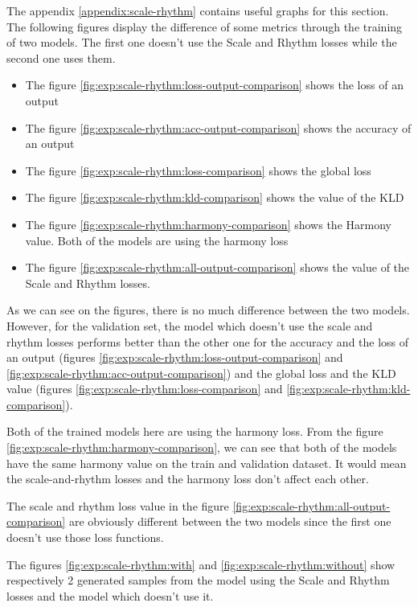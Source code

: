 \documentclass[12pt]{report}
\begin{document}
The appendix \ref{appendix:scale-rhythm} contains useful graphs for this section.
The following figures display the difference of some metrics through the training of two models. The first one doesn't use the Scale and Rhythm losses while the second one uses them.
\begin{itemize}
    \item The figure \ref{fig:exp:scale-rhythm:loss-output-comparison} shows the loss of an output
    \item The figure \ref{fig:exp:scale-rhythm:acc-output-comparison} shows the accuracy of an output
    \item The figure  \ref{fig:exp:scale-rhythm:loss-comparison} shows the global loss
    \item The figure \ref{fig:exp:scale-rhythm:kld-comparison} shows the value of the KLD
    \item The figure \ref{fig:exp:scale-rhythm:harmony-comparison} shows the Harmony value. Both of the models are using the harmony loss
    \item The figure \ref{fig:exp:scale-rhythm:all-output-comparison} shows the value of the Scale and Rhythm losses.
\end{itemize}

As we can see on the figures, there is no much difference between the two models.
However, for the validation set, the model which doesn't use the scale and rhythm losses performs better than the other one for the accuracy and the loss of an output (figures \ref{fig:exp:scale-rhythm:loss-output-comparison} and \ref{fig:exp:scale-rhythm:acc-output-comparison}) and the global loss and the KLD value (figures \ref{fig:exp:scale-rhythm:loss-comparison} and \ref{fig:exp:scale-rhythm:kld-comparison}).

Both of the trained models here are using the harmony loss.
From the figure \ref{fig:exp:scale-rhythm:harmony-comparison}, we can see that both of the models have the same harmony value on the train and validation dataset.
It would mean the scale-and-rhythm losses and the harmony loss don't affect each other.

The scale and rhythm loss value in the figure \ref{fig:exp:scale-rhythm:all-output-comparison} are obviously different between the two models since the first one doesn't use those loss functions.

The figures \ref{fig:exp:scale-rhythm:with} and \ref{fig:exp:scale-rhythm:without} show respectively 2 generated samples from the model using the Scale and Rhythm losses and the model which doesn't use it.
\end{document}
